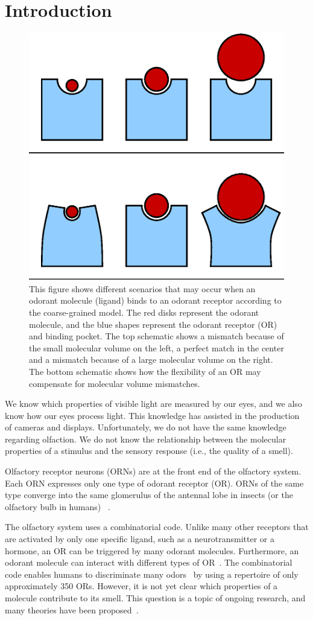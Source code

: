 \documentclass[fleqn,11pt]{wlscirep}
\begin{document}
\section*{Introduction}
\begin{figure}
	\centering
	\includegraphics[width=0.4 \textwidth]{binding-pocket-size-flex}
	\caption{This figure shows different scenarios that may occur when an odorant molecule (ligand) binds to an odorant receptor according to the coarse-grained model. 
		The red disks represent the odorant molecule, 
		and the blue shapes represent the odorant receptor (OR) and binding pocket.	
		The top schematic shows a mismatch because of the small molecular volume on the left, 
		a perfect match in the center and a mismatch because of a large molecular volume on the right.
		The bottom schematic shows how the flexibility of an OR may compensate for molecular volume mismatches.
		}
	\label{fig:binding-pocket}
\end{figure}

We know which properties of visible light are measured by our eyes, and we also know how our eyes process light. 
This knowledge has assisted in the production of cameras and displays. 
Unfortunately, we do not have the same knowledge regarding olfaction. 
We do not know the relationship between the molecular properties of a stimulus and the sensory response (i.e., the quality of a smell). 

Olfactory receptor neurons (ORNs) are at the front end of the olfactory system.
Each ORN expresses only one type of odorant receptor (OR). 
ORNs of the same type converge into the same glomerulus of the antennal lobe in insects (or the olfactory bulb in humans)
~\cite{root2007,Carey2011,Vosshall2000,Couto2005,fishilevich2005,gao2000,wang1998,mombaerts1996,vassar1994}.

The olfactory system uses a combinatorial code. 
Unlike many other receptors that are activated by only one specific ligand, such as a neurotransmitter or a hormone,
 an OR can be triggered by many odorant molecules. 
Furthermore, an odorant molecule can interact with different types of OR~\cite{Malnic2000}.
The combinatorial code enables humans to discriminate many odors~\cite{Bushdid2014} by using a repertoire of only approximately 350 ORs.
However, it is not yet clear which properties of a molecule contribute to its smell. 
This question is a topic of ongoing research, and many theories have been proposed~\cite{Turin,Keller2004,Araneda2000,Brookes2007,Franco2011,Pelz2006,Gabler2013,Schmuker2007,Haddad2008,Snitz2013,Yablonka2012,gane2013,
turin2015plausibility,block2015implausibility,vosshall2015laying}.
\end{document}

